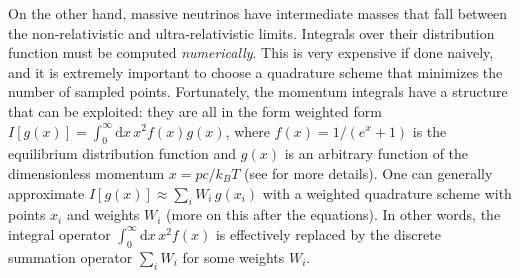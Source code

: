 \documentclass{aa}
\begin{document}
On the other hand, massive neutrinos have intermediate masses that fall between the non-relativistic and ultra-relativistic limits.
Integrals over their distribution function must be computed \emph{numerically}.
This is very expensive if done naively, and it is extremely important to choose a quadrature scheme that minimizes the number of sampled points.
Fortunately, the momentum integrals have a structure that can be exploited: they are all in the form weighted form $I[g(x)] = \int_0^\infty \mathrm{d}x \, x^2 f(x) g(x)$, where $f(x) = 1/(e^x+1)$ is the equilibrium distribution function and $g(x)$ is an arbitrary function of the dimensionless momentum $x = pc/k_B T$ (see \cite{maCosmologicalPerturbationTheory1995} for more details).
One can generally approximate $I[g(x)] \approx \sum_i W_i \, g(x_i)$ with a weighted quadrature scheme with points $x_i$ and weights $W_i$ (more on this after the equations).
In other words, the integral operator $\int_0^\infty \mathrm{d} x \, x^2 f(x)$ is effectively replaced by the discrete summation operator $\sum_i \! W_i$ for some weights $W_i$.
\end{document}
